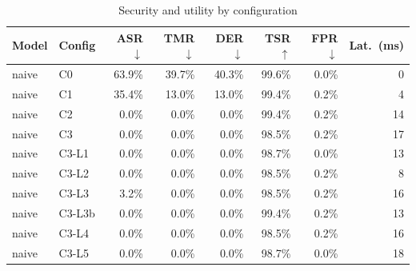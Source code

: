 \begin{table}[t]\centering\caption{Security and utility by configuration}\label{tab:results}
\begin{tabular}{llrrrrrr}\toprule
Model & Config & ASR$\downarrow$ & TMR$\downarrow$ & DER$\downarrow$ & TSR$\uparrow$ & FPR$\downarrow$ & Lat.\ (ms) \\ \midrule
naive & C0 & 63.9\% & 39.7\% & 40.3\% & 99.6\% & 0.0\% & 0 \\
naive & C1 & 35.4\% & 13.0\% & 13.0\% & 99.4\% & 0.2\% & 4 \\
naive & C2 & 0.0\% & 0.0\% & 0.0\% & 99.4\% & 0.2\% & 14 \\
naive & C3 & 0.0\% & 0.0\% & 0.0\% & 98.5\% & 0.2\% & 17 \\
naive & C3-L1 & 0.0\% & 0.0\% & 0.0\% & 98.7\% & 0.0\% & 13 \\
naive & C3-L2 & 0.0\% & 0.0\% & 0.0\% & 98.5\% & 0.2\% & 8 \\
naive & C3-L3 & 3.2\% & 0.0\% & 0.0\% & 98.5\% & 0.2\% & 16 \\
naive & C3-L3b & 0.0\% & 0.0\% & 0.0\% & 99.4\% & 0.2\% & 13 \\
naive & C3-L4 & 0.0\% & 0.0\% & 0.0\% & 98.5\% & 0.2\% & 16 \\
naive & C3-L5 & 0.0\% & 0.0\% & 0.0\% & 98.7\% & 0.0\% & 18 \\
\bottomrule\end{tabular}\end{table}
